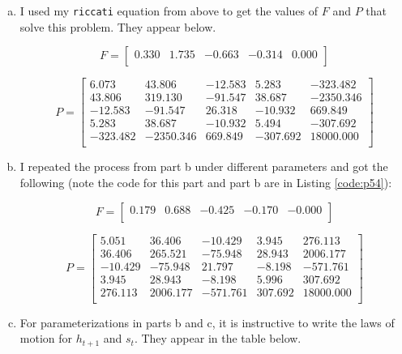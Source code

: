 \begin{homeworkProblem}[Problem 5.4]
{\begin{enumerate}[a.]
        \item I used my \texttt{riccati} equation from above to get the values of $F$ and $P$ that solve this problem. They appear below.

        $$F =
        \begin{bmatrix}
          0.330 & 1.735 & -0.663 & -0.314 & 0.000\\
        \end{bmatrix}
        $$

        $$
        P =
        \begin{bmatrix}
          6.073 & 43.806 & -12.583 & 5.283 & -323.482\\
          43.806 & 319.130 & -91.547 & 38.687 & -2350.346\\
          -12.583 & -91.547 & 26.318 & -10.932 & 669.849\\
          5.283 & 38.687 & -10.932 & 5.494 & -307.692\\
          -323.482 & -2350.346 & 669.849 & -307.692 & 18000.000\\
        \end{bmatrix}
        $$

        \item I repeated the process from part b under different parameters and got the following (note the code for this part and part b are in Listing \ref{code:p54}):

        $$
        F =
        \begin{bmatrix}
        0.179 & 0.688 & -0.425 & -0.170 & -0.000\\
      \end{bmatrix}
        $$

        $$
        P =
        \begin{bmatrix}
          5.051 & 36.406 & -10.429 & 3.945 & 276.113\\
          36.406 & 265.521 & -75.948 & 28.943 & 2006.177\\
          -10.429 & -75.948 & 21.797 & -8.198 & -571.761\\
          3.945 & 28.943 & -8.198 & 5.996 & 307.692\\
          276.113 & 2006.177 & -571.761 & 307.692 & 18000.000\\
        \end{bmatrix}
        $$

        \item For parameterizations in parts b and c, it is instructive to write the laws of motion for $h_{t+1}$ and $s_t$. They appear in the table below.


\end{enumerate}}
\end{homeworkProblem}
